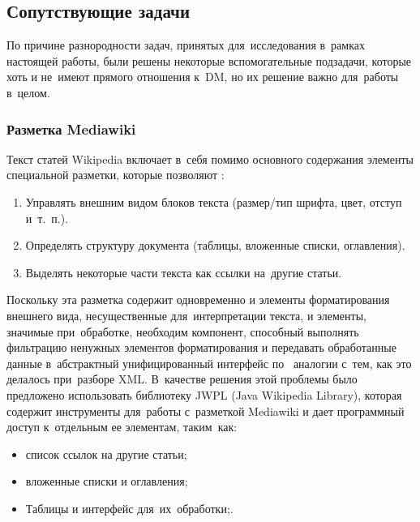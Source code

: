 \subsection{Сопутствующие задачи}

По причине разнородности задач, принятых для~исследования в~рамках настоящей работы,
были решены некоторые вспомогательные подзадачи, которые хоть и не~имеют прямого отношения к~DM, 
но их решение важно для~работы в~целом.

\subsubsection{Разметка Mediawiki}
\label{sec:wiki_markup}

Текст статей Wikipedia включает в~себя помимо основного содержания элементы специальной разметки, которые позволяют \cite{wikimarkup}:

\begin{enumerate}

\item{Управлять внешним видом блоков текста (размер/тип шрифта, цвет, отступ и~т.~п.).}
\item{Определять структуру документа (таблицы, вложенные списки, оглавления).}
\item{Выделять некоторые части текста как ссылки на~другие статьи.}

\end{enumerate}

Поскольку эта разметка содержит одновременно и элементы форматирования внешнего вида,
несущественные для~интерпретации текста, и элементы, значимые при~обработке,
необходим компонент, способный выполнять фильтрацию ненужных элементов форматирования
и передавать обработанные данные в~абстрактный унифицированный интерфейс 
по~ аналогии с~тем, как это делалось при~разборе XML.
В~качестве решения этой проблемы было предложено использовать библиотеку 
JWPL (Java Wikipedia Library)\cite{jwpl}, 
которая содержит инструменты для~работы с~разметкой Mediawiki\cite{wikimarkup} 
и дает программный доступ к~отдельным ее элементам, таким~как:

\begin{itemize}

\item {список ссылок на другие статьи;}
\item{вложенные списки и оглавления;}
\item{Таблицы и интерфейс для~их~обработки;.}

\end{itemize}

